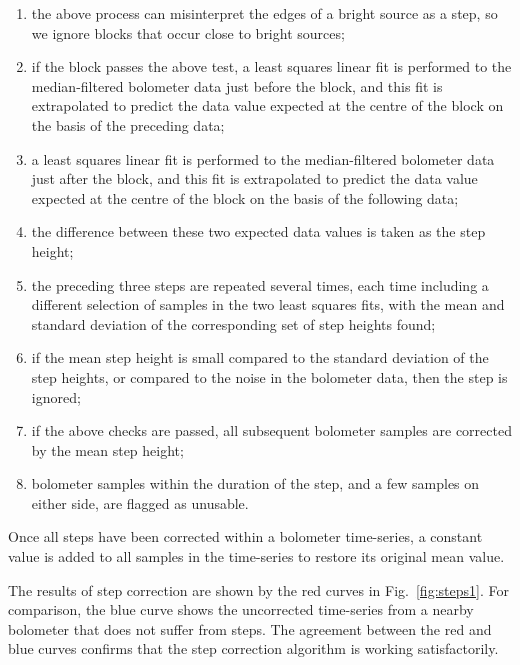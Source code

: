 \documentclass[useAMS,usenatbib,nofootinbib]{mn2e}
\begin{document}
\begin{enumerate}

\item the above process can misinterpret the edges of a bright source
as a step, so we ignore blocks that occur close to bright sources;

\item if the block passes the above test, a least squares linear fit
is performed to the median-filtered bolometer data just before the
block, and this fit is extrapolated to predict the data value expected
at the centre of the block on the basis of the preceding data;

\item a least squares linear fit is performed to the median-filtered
bolometer data just after the block, and this fit is extrapolated to
predict the data value expected at the centre of the block on the
basis of the following data;

\item the difference between these two expected data values is taken
as the step height;

\item the preceding three steps are repeated several times, each time
including a different selection of samples in the two least squares
fits, with the mean and standard deviation of the corresponding set of
step heights found;

\item if the mean step height is small compared to the standard deviation
of the step heights, or compared to the noise in the bolometer data, then
the step is ignored;

\item if the above checks are passed, all subsequent bolometer samples
are corrected by the mean step height;

\item bolometer samples within the duration of the step, and a few
samples on either side, are flagged as unusable.

\end{enumerate}

Once all steps have been corrected within a bolometer time-series, a
constant value is added to all samples in the time-series to restore its
original mean value.

The results of step correction are shown by the red curves in
Fig.~\ref{fig:steps1}. For comparison, the blue curve shows the
uncorrected time-series from a nearby bolometer that does not suffer from
steps. The agreement between the red and blue curves confirms that
the step correction algorithm is working satisfactorily.
\end{document}
